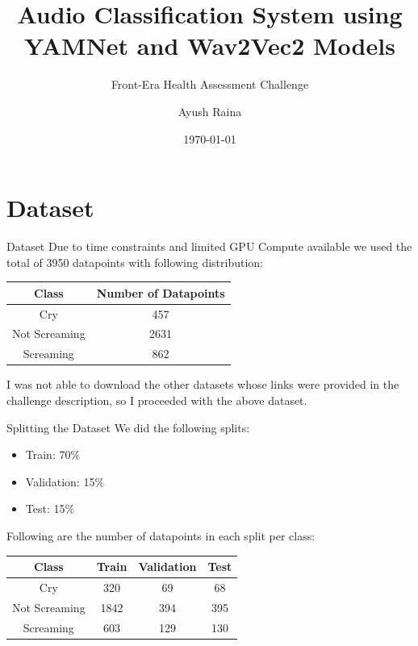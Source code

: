 \documentclass{beamer}
\author{Ayush Raina}
\title{Audio Classification System using YAMNet and Wav2Vec2 Models}
\subtitle{Front-Era Health Assessment Challenge}
\institute{
    Indian Institute of Science \\
}
\date{\today}
\begin{document}
\begin{frame}
    \titlepage
\end{frame}

\section*{Dataset}
\begin{frame}{Dataset}
    Due to time constraints and limited GPU Compute available we used the total of 3950 datapoints with following distribution:

    \begin{table}[h]
        \centering
        \begin{tabular}{|c|c|}
            \hline
            \textbf{Class} & \textbf{Number of Datapoints} \\
            \hline
            Cry & 457 \\
            \hline
            Not Screaming & 2631 \\
            \hline
            Screaming & 862 \\
            \hline
        \end{tabular}
    \end{table}

    I was not able to download the other datasets whose links were provided in the challenge description, so I proceeded with the above dataset.
\end{frame}

\begin{frame}{Splitting the Dataset}
    We did the following splits:
    \begin{itemize}
        \item Train: 70\%
        \item Validation: 15\%
        \item Test: 15\%
    \end{itemize}   

    Following are the number of datapoints in each split per class:
    \begin{table}[h]
        \centering
        \begin{tabular}{|c|c|c|c|}
            \hline
            \textbf{Class} & \textbf{Train} & \textbf{Validation} & \textbf{Test} \\
            \hline
            Cry & 320 & 69 & 68 \\
            \hline
            Not Screaming & 1842 & 394 & 395 \\
            \hline
            Screaming & 603 & 129 & 130 \\
            \hline
        \end{tabular}
    \end{table}
    
\end{frame}
\end{document}
